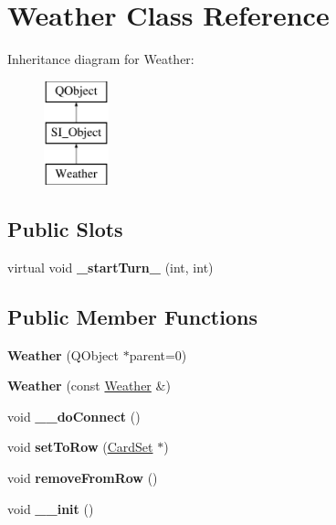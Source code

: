 \hypertarget{class_weather}{}\section{Weather Class Reference}
\label{class_weather}
Inheritance diagram for Weather\+:\begin{figure}[H]
\begin{center}
\leavevmode
\includegraphics[height=3.000000cm]{class_weather}
\end{center}
\end{figure}
\subsection*{Public Slots}
\begin{DoxyCompactItemize}
\item 
\mbox{\label{class_weather_a71873b46a578c3056113ce306de8d34e}} 
virtual void {\bfseries \+\_\+start\+Turn\+\_\+} (int, int)
\end{DoxyCompactItemize}
\subsection*{Public Member Functions}
\begin{DoxyCompactItemize}
\item 
\mbox{\label{class_weather_a1aa40de6a7c41ad78d2d64cbf9b43ba0}} 
{\bfseries Weather} (Q\+Object $\ast$parent=0)
\item 
\mbox{\label{class_weather_aa2bcf44c4341922b806aaa4b5839003c}} 
{\bfseries Weather} (const \hyperlink{class_weather}{Weather} \&)
\item 
\mbox{\label{class_weather_a565411dad19031111d17b4a89770491a}} 
void {\bfseries \+\_\+\+\_\+do\+Connect} ()
\item 
\mbox{\label{class_weather_a7bcdf5987eee6f28e8e3ea4bf6558602}} 
void {\bfseries set\+To\+Row} (\hyperlink{class_card_set}{Card\+Set} $\ast$)
\item 
\mbox{\label{class_weather_a3b5578263e2c356e25dd49dd3582ac17}} 
void {\bfseries remove\+From\+Row} ()
\item 
\mbox{\label{class_weather_af777d66f1dfa7587345e67c41d2d4bf2}} 
void {\bfseries \+\_\+\+\_\+init} ()
\end{DoxyCompactItemize}
